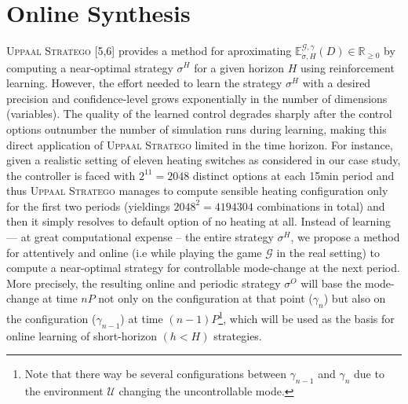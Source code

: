   \section{Online Synthesis}
    \textsc{Uppaal Stratego} [5,6] provides a method for aproximating 
    $\mathbb{E}^{\mathcal{G},\gamma}_{\sigma,H}(D) \in \mathbb{R}_{\geqslant 0}$
    by computing a near-optimal strategy $\sigma^H$ for a given horizon $H$ using 
    reinforcement learning. However, the effort needed to learn the strategy  
    $\sigma^H$ with a desired precision and confidence-level grows exponentially
    in the number of dimensions (variables). The quality of the learned control 
    degrades sharply after the control options outnumber the number of simulation
    runs during learning, making this direct application of \textsc{Uppaal Stratego}
    limited in the time horizon. For instance, given a realistic setting of eleven 
    heating switches as considered in our case study, the controller is faced with  
    $2^{11}=2048$ distinct options at each 15min period and thus \textsc{Uppaal Stratego}
    manages to compute sensible heating configuration only for the first two periods 
    (yieldings $2048^2=4194304$ combinations in total) and then it simply resolves 
    to default option of no heating at all.
    Instead of learning --- at great computational expense -- the   entire strategy
    $\sigma^H$, we propose a method for attentively and online (i.e while playing
    the game $\mathcal{G}$ in the real setting) to compute a near-optimal strategy for 
    controllable mode-change at the next period. More precisely, the resulting online 
    and periodic strategy $\sigma^O$ will base the mode-change at time $nP$ not only
    on the configuration at that point ($\gamma_n$) but also on the configuration
    ($\gamma_{n-1}$) at time $(n-1)P$\footnote{Note that there way be several configurations
    between $\gamma_{n-1}$ and $\gamma_n$ due to the environment $\mathcal{U}$ changing
    the uncontrollable mode.}, which will be used as the basis for online
    learning of short-horizon $(h < H)$ strategies.

